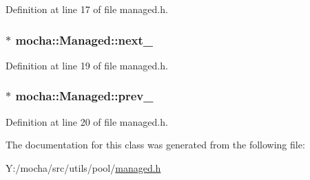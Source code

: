 Definition at line 17 of file managed.h.

\hypertarget{classmocha_1_1_managed_a732598822f2cec7406df37bcf789f68a}{
\subsubsection[{next\_\-}]{$\ast$ {\bf mocha::Managed::next\_\-}}}
\label{classmocha_1_1_managed_a732598822f2cec7406df37bcf789f68a}


Definition at line 19 of file managed.h.

\hypertarget{classmocha_1_1_managed_a113a03086a31cc2a7af2c4c72e001763}{
\subsubsection[{prev\_\-}]{$\ast$ {\bf mocha::Managed::prev\_\-}}}
\label{classmocha_1_1_managed_a113a03086a31cc2a7af2c4c72e001763}


Definition at line 20 of file managed.h.



The documentation for this class was generated from the following file:\begin{DoxyCompactItemize}
\item 
Y:/mocha/src/utils/pool/\hyperlink{managed_8h}{managed.h}\end{DoxyCompactItemize}
